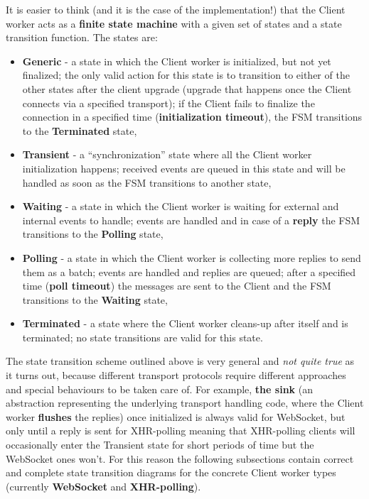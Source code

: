 \documentclass[a4paper]{article}
\begin{document}
It is easier to think (and it is the case of the implementation!) that the Client worker acts as a \textbf{finite state machine} with a given set of states and a state transition function. The states are:


\begin{itemize}
\item \textbf{Generic} - a state in which the Client worker is initialized, but not yet finalized; the only valid action for this state is to transition to either of the other states after the client upgrade (upgrade that happens once the Client connects via a specified transport); if the Client fails to finalize the connection in a specified time (\textbf{initialization timeout}), the FSM transitions to the \textbf{Terminated} state,
\item \textbf{Transient} - a ``synchronization'' state where all the Client worker initialization happens; received events are queued in this state and will be handled as soon as the FSM transitions to another state,
\item \textbf{Waiting} - a state in which the Client worker is waiting for external and internal events to handle; events are handled and in case of a \textbf{reply} the FSM transitions to the \textbf{Polling} state,
\item \textbf{Polling} - a state in which the Client worker is collecting more replies to send them as a batch; events are handled and replies are queued; after a specified time (\textbf{poll timeout}) the messages are sent to the Client and the FSM transitions to the \textbf{Waiting} state,
\item \textbf{Terminated} - a state where the Client worker cleans-up after itself and is terminated; no state transitions are valid for this state.
\end{itemize}

\noindent
The state transition scheme outlined above is very general and \emph{not quite true} as it turns out, because different transport protocols require different approaches and special behaviours to be taken care of. For example, \textbf{the sink} (an abstraction representing the underlying transport handling code, where the Client worker \textbf{flushes} the replies) once initialized is always valid for WebSocket, but only until a reply is sent for XHR-polling meaning that XHR-polling clients will occasionally enter the Transient state for short periods of time but the WebSocket ones won't. For this reason the following subsections contain correct and complete state transition diagrams for the concrete Client worker types (currently \textbf{WebSocket} and \textbf{XHR-polling}).
\end{document}
